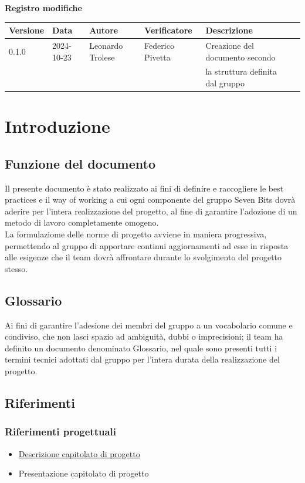 \documentclass[10pt]{article}
\begin{document}
\centering\textbf{Registro modifiche}\\
\vspace{2mm}
\begin{tabular}{|l|l|l|l|l|l|}
\hline
\textbf{Versione} & \textbf{Data} & \textbf{Autore} & \textbf{Verificatore} & \textbf{Descrizione}\\
\hline
0.1.0 & 2024-10-23  & Leonardo Trolese & Federico Pivetta  & Creazione del documento secondo \\ & & & & la struttura definita dal gruppo\\
\hline

\end{tabular}
\newpage
\raggedright
\tableofcontents
\newpage

\section{Introduzione}
    \subsection{Funzione del documento}
    Il presente documento è stato realizzato ai fini di definire e raccogliere le best 
    practices e il way of working a cui ogni componente del gruppo Seven Bits dovrà
    aderire per l'intera realizzazione del progetto, al fine di garantire l'adozione 
    di un metodo di lavoro completamente omogeno.\\
    La formulaziome delle norme di progetto avviene in maniera progressiva, permettendo
    al gruppo di apportare continui aggiornamenti ad esse in risposta alle esigenze che
    il team dovrà affrontare durante lo svolgimento del progetto stesso.\\ 

    \subsection{Glossario}
    Ai fini di garantire l'adesione dei membri del gruppo a un vocabolario comune 
    e condiviso, che non lasci spazio ad ambiguità, dubbi o imprecisioni; il team ha definito
    un documento denominato Glossario, nel quale sono presenti tutti i termini tecnici adottati
    dal gruppo per l'intera durata della realizzazione del progetto.

    \subsection{Riferimenti}
        \subsubsection{Riferimenti progettuali}
        \begin{itemize}
            \item \href{https://www.math.unipd.it/~tullio/IS-1/2024/Progetto/C4.pdf}{Descrizione capitolato di progetto}
            \item Presentazione capitolato di progetto 
        \end{itemize}
\end{document}
